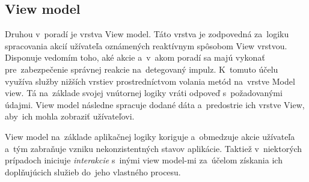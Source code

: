 \subsection{View model}\label{ViewModel}

Druhou v~poradí je vrstva View model. Táto vrstva je zodpovedná za~logiku spracovania akcií užívateľa oznámených reaktívnym spôsobom View vrstvou. Disponuje vedomím toho, aké akcie a~v~akom poradí sa majú vykonať pre~zabezpečenie správnej reakcie na~detegovaný impulz. K~tomuto účelu využíva služby nižších vrstiev prostredníctvom volania metód na~vrstve Model view. Tá na~základe svojej vnútornej logiky vráti odpoveď s~požadovanými údajmi. View model následne spracuje dodané dáta a~predostrie ich vrstve View, aby~ich mohla zobraziť užívateľovi.

View model na~základe aplikačnej logiky koriguje a~obmedzuje akcie užívateľa a~tým zabraňuje vzniku nekonzistentných stavov aplikácie. Taktiež v~niektorých prípadoch iniciuje \textit{interakcie} s~inými view model-mi za~účelom získania ich doplňujúcich služieb do~jeho vlastného procesu.


